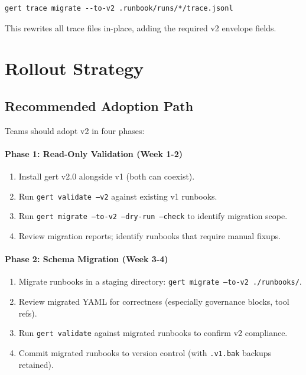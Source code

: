 \begin{verbatim}
gert trace migrate --to-v2 .runbook/runs/*/trace.jsonl
\end{verbatim}

This rewrites all trace files in-place, adding the required v2 envelope fields.

\section{Rollout Strategy}
\label{sec:rollout-strategy}

\subsection{Recommended Adoption Path}

Teams should adopt v2 in four phases:

\paragraph{Phase 1: Read-Only Validation (Week 1-2)}
\begin{enumerate}
  \item Install gert v2.0 alongside v1 (both can coexist).
  \item Run \texttt{gert validate --v2} against existing v1 runbooks.
  \item Run \texttt{gert migrate --to-v2 --dry-run --check} to identify migration scope.
  \item Review migration reports; identify runbooks that require manual fixups.
\end{enumerate}

\paragraph{Phase 2: Schema Migration (Week 3-4)}
\begin{enumerate}
  \item Migrate runbooks in a staging directory: \texttt{gert migrate --to-v2 ./runbooks/}.
  \item Review migrated YAML for correctness (especially governance blocks, tool refs).
  \item Run \texttt{gert validate} against migrated runbooks to confirm v2 compliance.
  \item Commit migrated runbooks to version control (with \texttt{.v1.bak} backups retained).
\end{enumerate}

